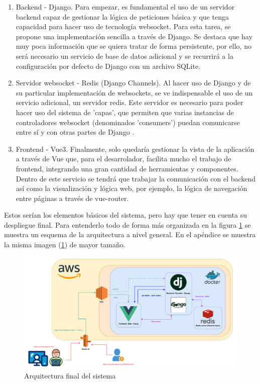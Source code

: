 \begin{enumerate}
	\item Backend - Django. Para empezar, es fundamental el uso de un servidor backend capaz de
	      gestionar la lógica de peticiones básica y que tenga capacidad para hacer uso de tecnología websocket.
	      Para esta tarea, se propone una implementación sencilla a través de Django. Se destaca que hay muy poca información que se
	      quiera tratar de forma persistente, por ello, no será necesario un servicio de base de datos adicional
	      y se recurrirá a la configuración por defecto de Django con un archivo SQLite.
	\item Servidor websocket - Redis (Django Channels). Al hacer uso de Django y de su particular implementación de
	      websockets, se ve indispensable el uso de un servicio adicional, un servidor redis. Este servidor es necesario para
	      poder hacer uso del sistema de 'capas', que permiten que varias instancias de controladores websocket
	      (denominados 'consumers') puedan comunicarse entre sí y con otras partes de Django \cite{djangoChannelsLayers}.
	\item Frontend - Vue3. Finalmente, solo quedaría gestionar la vista de la aplicación a través de Vue
	      que, para el desarrolador, facilita mucho el trabajo de frontend, integrando una gran cantidad de herramientas y componentes.
	      Dentro de este servicio se tendrá que trabajar la comunicación con el backend así como la visualización y lógica
	      web, por ejemplo, la lógica de navegación entre páginas a través de vue-router.
\end{enumerate}

Estos serían los elementos básicos del sistema, pero hay que tener en cuenta su
despliegue final. Para entenderlo todo de forma más organizada en la figura \ref{fig:res_arquitecturaSoftware} se muestra un esquema de la arquitectura
a nivel general. En el apéndice  se muestra la misma imagen (\ref{fig:res_arquitecturaSoftware}) de mayor tamaño.

\begin{figure}[h]
	\centering
	\includegraphics[width=\textwidth,clip=true]{res_arquitecturaSoftware.pdf}
	\caption{Arquitectura final del sistema}
	\label{fig:res_arquitecturaSoftware}
\end{figure}

